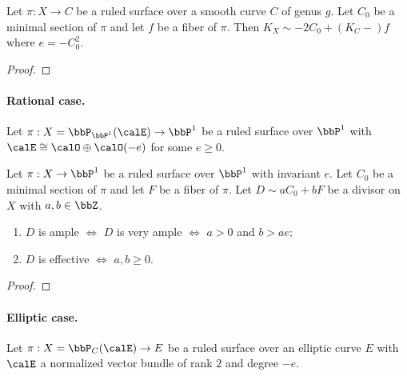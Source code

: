     \begin{proposition}\label{prop:canonical_divisor_of_ruled_surface}
        Let \(\pi:X \to C\) be a ruled surface over a smooth curve \(C\) of genus \(g\). 
        Let \(C_0\) be a minimal section of \(\pi\) and let \(f\) be a fiber of \(\pi\). 
        Then \(K_X \sim -2C_0 + (K_C-)f\) where \(e = -C_0^2\).
    \end{proposition}
    \begin{proof}
    \end{proof}

    \paragraph{Rational case.} Let \(\pi:X = \bbP_{\bbP^1}(\calE) \to \bbP^1\) be a ruled surface over \(\bbP^1\) with \(\calE \cong \calO \oplus \calO(-e)\) for some \(e \geq 0\).

    \begin{theorem}\label{thm:positivity_of_divisors_on_rational_ruled_surface}
        Let \(\pi:X \to \bbP^1\) be a ruled surface over \(\bbP^1\) with invariant \(e\).
        Let \(C_0\) be a minimal section of \(\pi\) and let \(F\) be a fiber of \(\pi\). 
        Let \(D \sim aC_0 + bF\) be a divisor on \(X\) with \(a,b \in \bbZ\).
        \begin{enumerate}
            \item \(D\) is ample \(\iff\) \(D\) is very ample \(\iff\) \(a > 0\) and \(b > ae\);
            \item \(D\) is effective \(\iff\) \(a,b \geq 0\).
        \end{enumerate} 
    \end{theorem}
    \begin{proof}
    \end{proof}


    \paragraph{Elliptic case.} Let \(\pi:X = \bbP_C(\calE) \to E\) be a ruled surface over an elliptic curve \(E\) with \(\calE\) a normalized vector bundle of rank \(2\) and degree \(-e\).

